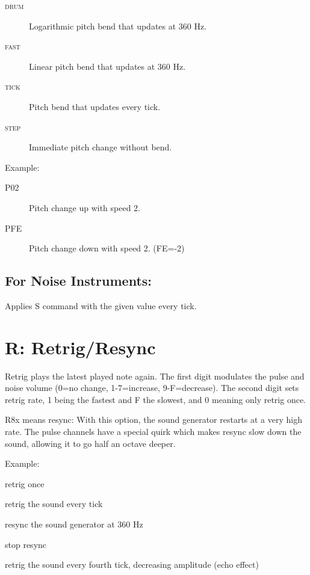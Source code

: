 \begin{description}
    \item[\textsc{drum}] Logarithmic pitch bend that updates at 360 Hz.
    \item[\textsc{fast}] Linear pitch bend that updates at 360 Hz.
    \item[\textsc{tick}] Pitch bend that updates every tick.
    \item[\textsc{step}] Immediate pitch change without bend.
\end{description}

Example:

\begin{description}
\item[P02] Pitch change up with speed 2.
\item[PFE] Pitch change down with speed 2. (FE=-2)
\end{description}

\subsection{For Noise Instruments:}

Applies S command with the given value every tick.

\section{R: Retrig/Resync}

Retrig plays the latest played note again. The first digit modulates the pulse and noise volume (0=no change, 1-7=increase, 9-F=decrease). The second digit sets retrig rate, 1 being the fastest and F the slowest, and 0 meaning only retrig once.

R8x means resync: With this option, the sound generator restarts at a very high rate. The pulse channels have a special quirk which makes resync slow down the sound, allowing it to go half an octave deeper.

\begin{description}
\item Example:
\item[R00] retrig once
\item[R01] retrig the sound every tick
\item[R80] resync the sound generator at 360 Hz
\item[R8F] stop resync
\item[RF4] retrig the sound every fourth tick, decreasing amplitude (echo effect)
\end{description}

